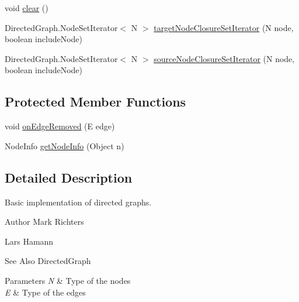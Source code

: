 \begin{DoxyCompactItemize}
\item 
void \hyperlink{classorg_1_1tzi_1_1use_1_1graph_1_1_directed_graph_base_3_01_n_00_01_e_01extends_01_directed_edge_3_01_n_01_4_01_4_a29a115ef317c5019f27da9d7a276e065}{clear} ()
\item 
Directed\-Graph.\-Node\-Set\-Iterator$<$ N $>$ \hyperlink{classorg_1_1tzi_1_1use_1_1graph_1_1_directed_graph_base_3_01_n_00_01_e_01extends_01_directed_edge_3_01_n_01_4_01_4_ac519800d0865b233138891afdba9b83d}{target\-Node\-Closure\-Set\-Iterator} (N node, boolean include\-Node)
\item 
Directed\-Graph.\-Node\-Set\-Iterator$<$ N $>$ \hyperlink{classorg_1_1tzi_1_1use_1_1graph_1_1_directed_graph_base_3_01_n_00_01_e_01extends_01_directed_edge_3_01_n_01_4_01_4_a40099698fe86866d9f4aed6e908b0a69}{source\-Node\-Closure\-Set\-Iterator} (N node, boolean include\-Node)
\end{DoxyCompactItemize}
\subsection*{Protected Member Functions}
\begin{DoxyCompactItemize}
\item 
void \hyperlink{classorg_1_1tzi_1_1use_1_1graph_1_1_directed_graph_base_3_01_n_00_01_e_01extends_01_directed_edge_3_01_n_01_4_01_4_accfed38f573d0b3b9c8f46ac8e68a1dc}{on\-Edge\-Removed} (E edge)
\item 
Node\-Info \hyperlink{classorg_1_1tzi_1_1use_1_1graph_1_1_directed_graph_base_3_01_n_00_01_e_01extends_01_directed_edge_3_01_n_01_4_01_4_a12b6c1118088f79ec9c2eac9d78b0404}{get\-Node\-Info} (Object n)
\end{DoxyCompactItemize}


\subsection{Detailed Description}
Basic implementation of directed graphs. \begin{DoxyAuthor}{Author}
Mark Richters 

Lars Hamann 
\end{DoxyAuthor}
\begin{DoxySeeAlso}{See Also}
Directed\-Graph 
\end{DoxySeeAlso}

\begin{DoxyParams}{Parameters}
{\em N} & Type of the nodes \\
\hline
{\em E} & Type of the edges \\
\hline
\end{DoxyParams}


